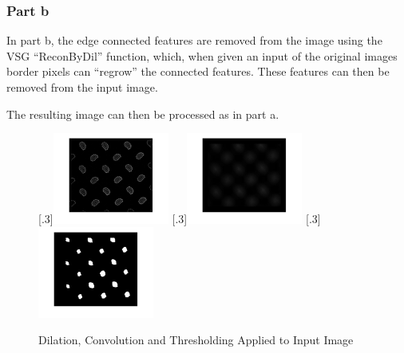 \documentclass[a4paper]{article}
\begin{document}
	\subsubsection{Part b}
	\par In part b, the edge connected features are removed from the image
	using the VSG ``ReconByDil'' function, which, when given an input of the
	original images border pixels can ``regrow'' the connected features.
	These features can then be removed from the input image.
	\par The resulting image can then be processed as in part a.
	\begin{figure}[H]
		\centering
		[.3\linewidth]{\includegraphics[height=3cm]{Results/Q3/b/qbDilation.jpg}}%
		[.3\linewidth]{\includegraphics[height=3cm]{Results/Q3/b/qbConvolution.jpg}}%
		[.3\linewidth]{\includegraphics[height=3cm]{Results/Q3/b/qbThreshold.jpg}}%
		\caption{Dilation, Convolution and Thresholding Applied to Input
		Image}
		\label{fig:}
	\end{figure}
\end{document}
